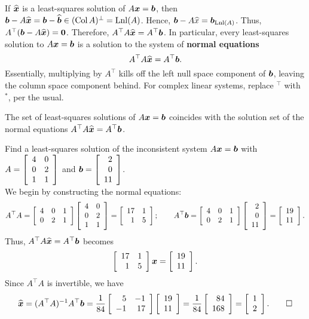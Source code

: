 If $\widehat{\bb x}$ is a least-squares solution of $A\bb x = \bb b$, then $\bb b - A\widehat{\bb x} = \bb b - \widehat{\bb b} \in (\col A)^\perp = \lnl( A)$. Hence, $\bb b - A\widehat{x} = \bb b_{\lnl(A)}$. Thus, $A^\top(\bb b - A\widehat{\bb x}) = \bb 0$. Therefore, $A^\top A\widehat{\bb x} = A^\top\bb b$. In particular, every least-squares solution to $A\bb x = \bb b$ is a solution to the system of \textbf{normal equations}
\begin{equation} A^\top A\widehat{\bb x} = A^\top\bb b.\end{equation} Essentially, multiplying by $A^\top$ kills off the left null space component of $\bb b$, leaving the column space component behind. For complex linear systems, replace $^\top$ with $^*$, per the usual.\\

\begin{Thm} The set of least-squares solutions of $A\bb x = \bb b$ coincides with the solution set of the normal equations $A^\top A\widehat{\bb x} = A^\top\bb b$.\end{Thm}\vs


\begin{Exam}\label{exam:least1} Find a least-squares solution of the inconsistent system $A\bb x = \bb b$ with \\
$A = \mtx{rr}{4&0\\0&2\\1&1}$ and $\bb b = \vr{2\\0\\11}$.\\

We begin by constructing the normal equations:
\[A^\top A = \mtx{rrrr}{4&0&1\\0&2&1}\mtx{rr}{4&0\\0&2\\1&1} = \mtx{rr}{17&1\\1&5};\qquad A^\top\bb b = \mtx{rrrr}{4&0&1\\0&2&1}\vr{2\\0\\11} = \vr{19\\11}.\] Thus, $A^\top A\widehat{\bb x} = A^\top\bb b$ becomes
\[\mtx{rr}{17&1\\1&5}\bb x = \vr{19\\11}.\] Since $A^\top A$ is invertible, we have
\[\widehat{\bb x} = (A^\top A)^{-1}A^\top\bb b = \dfrac{1}{84}\mtx{rr}{5&-1\\-1&17}\vr{19\\11} = \dfrac{1}{84}\vr{84\\168} = \vr{1\\2}. \qedhere\]
\end{Exam}\vs

